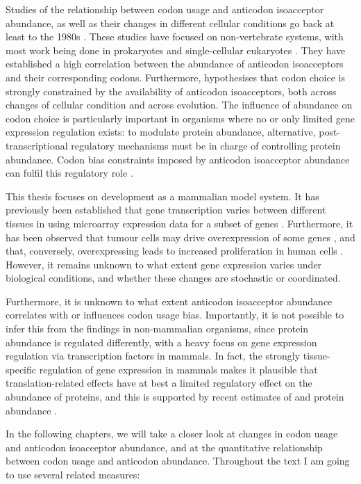Studies of the relationship between codon usage and \trna anticodon isoacceptor
abundance, as well as their changes in different cellular conditions go back at
least to the 1980s \citep{Ikemura:1981}. These studies have focused on
non-vertebrate systems, with most work being done in prokaryotes and
single-cellular eukaryotes \citep{Ikemura:1985}. They have established a high
correlation between the abundance of \trna anticodon isoacceptors and their
corresponding codons. Furthermore, \citet{Ikemura:1981} hypothesises that codon
choice is strongly constrained by the availability of \trna anticodon
isoacceptors, both across changes of cellular condition and across evolution.
The influence of \trna abundance on codon choice is particularly important in
organisms where no or only limited gene expression regulation exists: to
modulate protein abundance, alternative, post-transcriptional regulatory
mechanisms must be in charge of controlling protein abundance. Codon bias
constraints imposed by \trna anticodon isoacceptor abundance can fulfil this
regulatory role \citep{Horn:2008}.

This thesis focuses on \mmu development as a mammalian model system. It has
previously been established that \trna gene transcription varies between
different tissues in \hsa using microarray expression data for a subset of \trna
genes \citep{Dittmar:2006}. Furthermore, it has been observed that tumour cells
may drive overexpression of some \trna genes
\citep{Winter:2000,Pavon-Eternod:2009}, and that, conversely, overexpressing
 leads to increased proliferation in human cells
\citep{Pavon-Eternod:2013}. However, it remains unknown to what extent \trna
gene expression varies under biological conditions, and whether these changes
are stochastic or coordinated.

Furthermore, it is unknown to what extent \trna anticodon isoacceptor abundance
correlates with or influences codon usage bias. Importantly, it is not possible
to infer this from the findings in non-mammalian organisms, since protein
abundance is regulated differently, with a heavy focus on gene expression
regulation via transcription factors in mammals. In fact, the strongly
tissue-specific regulation of gene expression in mammals makes it plausible that
translation-related effects have at best a limited regulatory effect on the
abundance of proteins, and this is supported by recent estimates of \mrna and
protein abundance \citep{Li:2014,Csardi:2014,Jovanovic:2015}.

In the following chapters, we will take a closer look at changes in codon usage
and \trna anticodon isoacceptor abundance, and at the quantitative relationship
between codon usage and anticodon abundance. Throughout the text I am going to
use several related measures:

